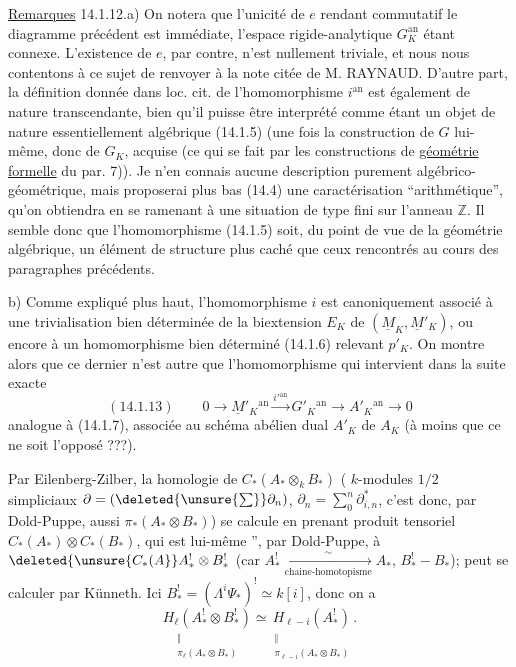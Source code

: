 \uline{Remarques} 14.1.12.\quad a) On notera que l'unicité de $e$ rendant commutatif
le diagramme précédent est immédiate, l'espace rigide-analytique $G_K^{\mathrm{an}}$
étant connexe. L'existence de $e$, par contre, n'est nullement triviale,
et nous nous contentons à ce sujet de renvoyer à la note citée de
M. RAYNAUD. D'autre part, la définition donnée dans loc. cit. de
l'homomorphisme $i^{\mathrm{an}}$ est également de nature transcendante, bien qu'il
puisse être interprété comme étant un objet de nature essentiellement
algébrique (14.1.5) (une fois la construction de $G$ lui-même, donc de
$G_K$, acquise (ce qui se fait par les constructions de \uline{géométrie formelle}
du par. 7)). Je n'en connais aucune description purement algébrico-géométrique,
mais proposerai plus bas (14.4) une caractérisation
``arithmétique'', qu'on obtiendra en se ramenant à une situation de type
fini sur l'anneau $\mathbb Z$. Il semble donc que l'homomorphisme (14.1.5) soit,
du point de vue de la géométrie algébrique, un élément de structure
plus caché que ceux rencontrés au cours des paragraphes précédents.

b) Comme expliqué plus haut, l'homomorphisme $i$ est canoniquement
associé à une trivialisation bien déterminée de la biextension $E_K$ de
$(\underline M_K,\underline M'_K)$, ou encore à un homomorphisme bien déterminé (14.1.6) relevant $p'_K$.
On montre alors que ce dernier n'est autre que l'homomorphisme qui
intervient dans la suite exacte
\[
(14.1.13)\qquad0\longrightarrow\underline M'_K{}^{\mathrm{an}}
\xrightarrow{i'{}^{\mathrm{an}}}G'_K{}^{\mathrm{an}}\longrightarrow A'_K{}^{\mathrm{an}}\longrightarrow0
\]
analogue à (14.1.7), associée au schéma abélien dual $A'_K$ de $A_K$ (à moins
que ce ne soit l'opposé ???).

Par Eilenberg-Zilber, la homologie de
$C_*(A_*\otimes_k B_*)$ (
$k$-modules $1/2$ simpliciaux \deleted{$\unsure{\Phi_*\longrightarrow}$}
$\partial=(\deleted{\unsure{\sum}}\partial_n)$,
$\partial_n=\sum_0^n\partial^*_{i,n}$,
c'est donc, par Dold-Puppe, aussi $\pi_*(A_*\otimes B_*)$)
se calcule en prenant  produit tensoriel
 $C_*(A_*)\otimes C_*(B_*)$, qui est lui-même
'', par Dold-Puppe, à
$\deleted{\unsure{C_*(A}}A_*^!\otimes B_*^!$
(car $A_*^!\xrightarrow[\text{chaine-homotopisme}]{\sim}A_*$,
$B_*^!\mathbin{-}B_*$);
 peut se calculer par Künneth.
Ici $B_*^!=(\Lambda^i\Psi_*)^!\simeq k[i]$, donc on  a
\[
\underset{\substack{\Vert\\\pi_\ell(A_*\otimes B_*)}}{H_\ell(A_*^!\otimes B_*^!)}
\simeq
\underset{\substack{\Vert\\\pi_{\ell-i}(A_*\otimes B_*)}}{H_{\ell-i}(A_*^!)}.
\]

